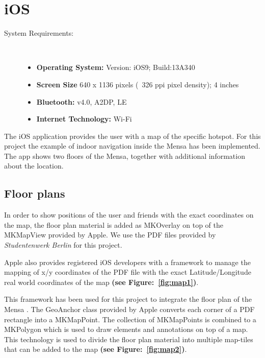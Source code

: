 \vspace{0.5cm}

\section{iOS}

\begin{description}
\item[System Requirements:] \hfill \\
\begin{itemize}
  \item \textbf{Operating System:} Version: iOS9; Build:13A340
  \item \textbf{Screen Size} 640 x 1136 pixels (~326 ppi pixel density); 4 inches
  \item \textbf{Bluetooth:} v4.0, A2DP, LE
  \item \textbf{Internet Technology:} Wi-Fi
\end{itemize}
\end{description}

The iOS application provides the user with a map of the specific hotspot. For this project the example of indoor navigation inside the Mensa has been implemented. The app shows two floors of the Mensa, together with additional information about the location.

\subsection{Floor plans}
In order to show positions of the user and friends with the exact coordinates on the map, the floor plan material is added as MKOverlay on top of the MKMapView provided by Apple. We use the PDF files provided by \textit{Studentenwerk Berlin} for this project.

Apple also provides registered iOS developers with a framework to manage the mapping of x/y coordinates of the PDF file with the exact Latitude/Longitude real world coordinates of the map
\textbf{(see Figure:~\ref{fig:map1})}.

This framework has been used for this project to integrate the floor plan of the Mensa \cite{AppleFootprint}. The GeoAnchor class provided by Apple converts each corner of a PDF rectangle into a MKMapPoint. The collection of MKMapPoints is combined to a MKPolygon which is used to draw elements and annotations on top of a map. This technology is used to divide the floor plan material into multiple map-tiles that can be added to the map \textbf{(see Figure:~\ref{fig:map2})}.


